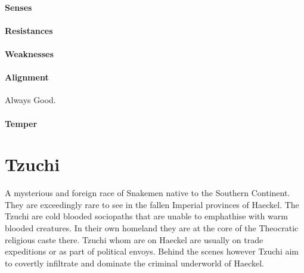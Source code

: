 \begin{multicols}{2}
    \paragraph{Senses} 
    \paragraph{Resistances} 
    \paragraph{Weaknesses} 
    
    \paragraph{Alignment} Always Good. 
    \paragraph{Temper} 

\section{Tzuchi}
    A mysterious and foreign race of Snakemen native to the Southern Continent. They are exceedingly rare to see in the fallen Imperial provinces of Haeckel. The Tzuchi are cold blooded sociopaths that are unable to emphathise with warm blooded creatures. In their own homeland they are at the core of the Theocratic religious caste there. Tzuchi whom are on Haeckel are usually on trade expeditions or as part of political envoys. Behind the scenes however Tzuchi aim to covertly infiltrate and dominate the criminal underworld of Haeckel. 
    

\end{multicols}
